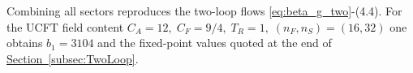 \documentclass[pdflatex,sn-mathphys-num]{sn-jnl}
\theoremstyle{thmstyleone}
\theoremstyle{thmstyletwo}%
\theoremstyle{thmstylethree}%
\newcommand{\subsecref}[1]{\hyperref[#1]{Section~\ref*{#1}}}
\begin{document}
Combining all sectors reproduces the two-loop flows
\eqref{eq:beta_g_two}-(4.4).  For the UCFT field content
\(C_{A}=12,\;C_{F}=9/4,\;T_{R}=1,\;(n_{F},n_{S})=(16,32)\) one obtains
\(b_{1}=3104\) and the fixed-point values quoted at the end of
\subsecref{subsec:TwoLoop}.



\end{document}
